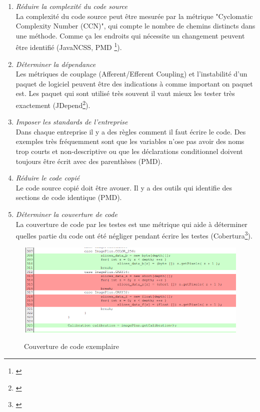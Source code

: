 \begin{enumerate}

\item \textit{Réduire la complexité du code source} \\ La complexité du code source peut être mesurée par la métrique "Cyclomatic Complexity Number (CCN)", qui compte le nombre de chemins distincts dans une méthode. Comme ça les endroits qui nécessite un changement peuvent être identifié (JavaNCSS, PMD \footnote{\citep{pluginpmd}}).

\item \textit{Déterminer la dépendance} \\ Les métriques de couplage (Afferent/Efferent Coupling) et l'instabilité d'un paquet de logiciel peuvent être des indications à comme important on paquet est. Les paquet qui sont utilisé très souvent il vaut mieux les tester très exactement (JDepend\footnote{\citep{pluginjdepend}}).

\item \textit{Imposer les standards de l'entreprise}\\ Dans chaque entreprise il y a des règles comment il faut écrire le code. Des exemples très fréquemment sont que les variables n'ose pas avoir des noms trop courts et non-descriptive ou que les déclarations conditionnel doivent toujours être écrit avec des parenthèses (PMD).
\item \textit{Réduire le code copié} \\ Le code source copié doit être avouer. Il y a des outils qui identifie des sections de code identique (PMD).

\item \textit{Déterminer la couverture de code} \\ La couverture de code par les testes est une métrique qui aide à déterminer quelles partie du code ont été négliger pendant écrire les testes (Cobertura\footnote{\citep{plugincobertura}}).

\end{enumerate}

\begin{figure}[H]
\centering
\includegraphics[width=15cm]{bilder/Coverage}
\caption{Couverture de code exemplaire} \cite{codecoverage}
\label{fig:coverage}
\end{figure}


